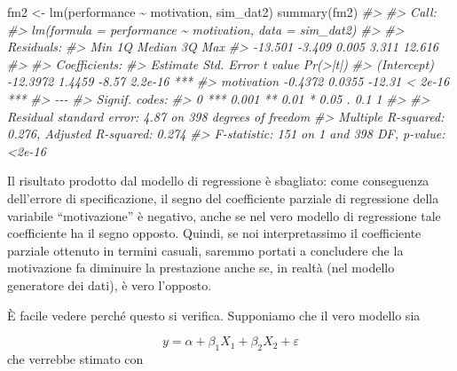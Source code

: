 \documentclass[
  11pt,
]{krantz}
\makeatletter
\newenvironment{Shaded}{\begin{snugshade}}{\end{snugshade}}
\newcommand{\CommentTok}[1]{\textcolor[rgb]{0.37,0.37,0.37}{\textit{#1}}}
\newcommand{\FunctionTok}[1]{\textcolor[rgb]{0,0,0}{#1}}
\newcommand{\NormalTok}[1]{#1}
\newcommand{\OtherTok}[1]{\textcolor[rgb]{0.37,0.37,0.37}{#1}}
\newcommand{\SpecialCharTok}[1]{\textcolor[rgb]{0,0,0}{#1}}
\newenvironment{kframe}{%
\medskip{}
\setlength{\fboxsep}{.8em}
 \def\at@end@of@kframe{}%
 \ifinner\ifhmode%
  \def\at@end@of@kframe{\end{minipage}}%
  \begin{minipage}{\columnwidth}%
 \fi\fi%
 \def\FrameCommand##1{\hskip\@totalleftmargin \hskip-\fboxsep
 \colorbox{shadecolor}{##1}\hskip-\fboxsep
     \hskip-\linewidth \hskip-\@totalleftmargin \hskip\columnwidth}%
 \MakeFramed {\advance\hsize-\width
   \@totalleftmargin\z@ \linewidth\hsize
   \@setminipage}}%
 {\par\unskip\endMakeFramed%
 \at@end@of@kframe}
\renewenvironment{Shaded}{\begin{kframe}}{\end{kframe}}
\makeatother
\begin{document}
\begin{Shaded}
\begin{Highlighting}[]
\NormalTok{fm2 }\OtherTok{\textless{}{-}} \FunctionTok{lm}\NormalTok{(performance }\SpecialCharTok{\textasciitilde{}}\NormalTok{ motivation, sim\_dat2)}
\FunctionTok{summary}\NormalTok{(fm2)}
\CommentTok{\#\textgreater{} }
\CommentTok{\#\textgreater{} Call:}
\CommentTok{\#\textgreater{} lm(formula = performance \textasciitilde{} motivation, data = sim\_dat2)}
\CommentTok{\#\textgreater{} }
\CommentTok{\#\textgreater{} Residuals:}
\CommentTok{\#\textgreater{}     Min      1Q  Median      3Q     Max }
\CommentTok{\#\textgreater{} {-}13.501  {-}3.409   0.005   3.311  12.616 }
\CommentTok{\#\textgreater{} }
\CommentTok{\#\textgreater{} Coefficients:}
\CommentTok{\#\textgreater{}             Estimate Std. Error t value Pr(\textgreater{}|t|)    }
\CommentTok{\#\textgreater{} (Intercept) {-}12.3972     1.4459   {-}8.57  2.2e{-}16 ***}
\CommentTok{\#\textgreater{} motivation   {-}0.4372     0.0355  {-}12.31  \textless{} 2e{-}16 ***}
\CommentTok{\#\textgreater{} {-}{-}{-}}
\CommentTok{\#\textgreater{} Signif. codes:  }
\CommentTok{\#\textgreater{} 0 \textquotesingle{}***\textquotesingle{} 0.001 \textquotesingle{}**\textquotesingle{} 0.01 \textquotesingle{}*\textquotesingle{} 0.05 \textquotesingle{}.\textquotesingle{} 0.1 \textquotesingle{} \textquotesingle{} 1}
\CommentTok{\#\textgreater{} }
\CommentTok{\#\textgreater{} Residual standard error: 4.87 on 398 degrees of freedom}
\CommentTok{\#\textgreater{} Multiple R{-}squared:  0.276,  Adjusted R{-}squared:  0.274 }
\CommentTok{\#\textgreater{} F{-}statistic:  151 on 1 and 398 DF,  p{-}value: \textless{}2e{-}16}
\end{Highlighting}
\end{Shaded}

Il risultato prodotto dal modello di regressione è sbagliato: come conseguenza dell'errore di specificazione, il segno del coefficiente parziale di regressione della variabile ``motivazione'' è negativo, anche se nel vero modello di regressione tale coefficiente ha il segno opposto. Quindi, se noi interpretassimo il coefficiente parziale ottenuto in termini casuali, saremmo portati a concludere che la motivazione fa diminuire la prestazione anche se, in realtà (nel modello generatore dei dati), è vero l'opposto.

È facile vedere perché questo si verifica. Supponiamo che il vero modello sia

\[
y = \alpha + \beta_1 X_1 + \beta_2 X_2 + \varepsilon
\] che verrebbe stimato con
\end{document}
